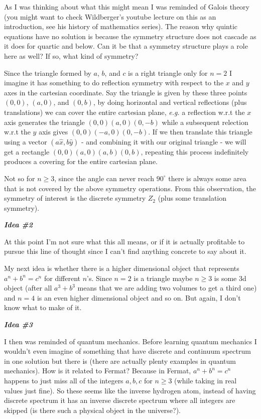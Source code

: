 \documentclass[aps,preprint,preprintnumbers,nofootinbib,showpacs,prd]{revtex4-1}
\newcommand{\eg}{{\it e.g.} }
\begin{document}
As I was thinking about what this might mean I was reminded of Galois theory (you might want to check Wildberger's youtube lecture on this as an introduction, see his history of mathematics series). The reason why quintic equations have no solution is because the symmetry structure does not cascade as it does for quartic and below. Can it be that a symmetry structure plays a role here as well? If so, what kind of symmetry?

Since the triangle formed by $a$, $b$, and $c$ is a right triangle only for $n=2$ I imagine it has something to do reflection symmetry with respect to the $x$ and $y$ axes in the cartesian coordinate. Say the triangle is given by these three points $(0, 0)$, $(a, 0)$, and $(0, b)$, by doing horizontal and vertical reflections (plus translations) we can cover the entire cartesian plane, \eg a reflection w.r.t the $x$ axis generates the triangle $(0,0) (a,0) (0,-b)$ while a subsequent relection w.r.t the $y$ axis gives $(0,0) (-a,0) (0,-b)$. If we then translate this triangle using a vector $(a \hat x, b \hat y)$ - and combining it with our original triangle - we will get a rectangle $(0,0) (a,0) (a,b) (0,b)$, repeating this process indefinitely produces a covering for the entire cartesian plane.

Not so for $n \ge 3$, since the angle can never reach $90^\circ$ there is always some area that is not covered by the above symmetry operations. From this observation, the symmetry of interest is the discrete symmetry $Z_2$ (plus some translation symmetry).

\bigskip\textbf{\textit{Idea \#2}}

At this point I'm not sure what this all means, or if it is actually profitable to pursue this line of thought since I can't find anything concrete to say about it.

My next idea is whether there is a higher dimensional object that represents $a^n + b^n = c^n$ for different $n$'s. Since $n=2$ is a triangle maybe $n \ge 3$ is some 3d object (after all $a^3 + b^3$ means that we are adding two volumes to get a third one) and $n=4$ is an even higher dimensional object and so on. But again, I don't know what to make of it.

\bigskip\textbf{\textit{Idea \#3}}

I then was reminded of quantum mechanics. Before learning quantum mechanics I wouldn't even imagine of something that have discrete and continuum spectrum in one solution but there is (there are actually plenty examples in quantum mechanics). How is it related to Fermat? Because in Fermat, $a^n + b^n = c^n$ happens to just miss all of the integers $a,b,c$ for $n \ge 3$ (while taking in real values just fine). So these seems like the inverse hydrogen atom, instead of having discrete spectrum it has an inverse discrete spectrum where all integers are skipped (is there such a physical object in the universe?).
\end{document}
